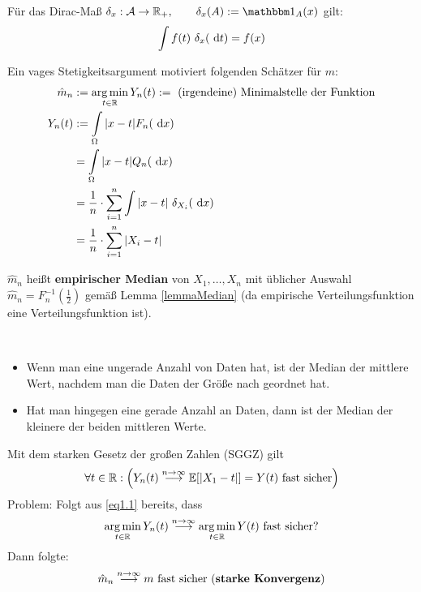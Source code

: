 \begin{erinnerung}
	Für das Dirac-Maß $\delta_x:\A\to\R_+,\qquad\delta_x(A):=\indi_A(x)$ gilt:
	\begin{align*}
		\int\limits f(t)~\delta_x(\text{ d} t)=f(x)
	\end{align*}
\end{erinnerung}

Ein vages Stetigkeitsargument motiviert folgenden Schätzer für $m$:
\begin{align*}
	\hat{m}_n&:=\operatorname*{arg\,min}\limits_{t\in\mathbb{R}}Y_n(t):=\text{ (irgendeine) Minimalstelle der Funktion}\\
	Y_n(t)&:=\int\limits_\Omega |x-t|F_n(\text{ d} x)\\ 
	&=\int\limits_\Omega |x-t|Q_n(\text{ d} x)\\ 
	&=\frac{1}{n}\cdot\sum\limits_{i=1}^n\int\limits|x-t|~\delta_{X_i}(\text{ d} x)\\
	&=\frac{1}{n}\cdot\sum\limits_{i=1}^n|X_i-t|
\end{align*} 

$\hat{m}_n$ heißt \textbf{empirischer Median} von $X_1,\ldots,X_n$ mit üblicher Auswahl $\hat{m}_n=F_n^{-1}\left(\frac{1}{2}\right)$ gemäß Lemma \ref{lemmaMedian} (da empirische Verteilungsfunktion eine Verteilungsfunktion ist).

\begin{bemerkung}\
	\begin{itemize}
		\item Wenn man eine ungerade Anzahl von Daten hat, ist der Median der mittlere Wert, nachdem man die Daten der Größe nach geordnet hat.
		\item Hat man hingegen eine gerade Anzahl an Daten, dann ist der Median der kleinere der beiden mittleren Werte.
	\end{itemize}
\end{bemerkung}

Mit dem starken Gesetz der großen Zahlen (SGGZ) gilt
\begin{align}\label{eq1.1}
	\forall t\in\mathbb{R}: \Big(Y_n(t)\stackrel{n\to\infty}{\longrightarrow}
	\mathbb{E}[|X_1-t|]=Y(t)\text{ fast sicher}\Big)
\end{align}
Problem: Folgt aus \eqref{eq1.1} bereits, dass
\begin{align*}
	\operatorname*{arg\,min}\limits_{t\in\mathbb{R}} Y_n(t)
	\stackrel{n\to\infty}{\longrightarrow}
	\operatorname*{arg\,min}\limits_{t\in\mathbb{R}}
	Y(t)\text{ fast sicher?}
\end{align*}
Dann folgte:
\begin{align*}
	\hat{m}_n
	\stackrel{n\to\infty}{\longrightarrow}
	m\text{ fast sicher (\textbf{starke Konvergenz})}
\end{align*}

